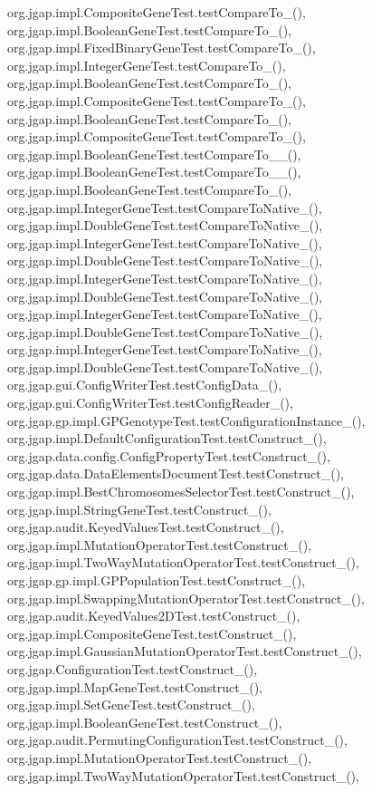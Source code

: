 org.\-jgap.\-impl.\-Composite\-Gene\-Test.\-test\-Compare\-To\-\_(), org.\-jgap.\-impl.\-Boolean\-Gene\-Test.\-test\-Compare\-To\-\_(), org.\-jgap.\-impl.\-Fixed\-Binary\-Gene\-Test.\-test\-Compare\-To\-\_(), org.\-jgap.\-impl.\-Integer\-Gene\-Test.\-test\-Compare\-To\-\_(), org.\-jgap.\-impl.\-Boolean\-Gene\-Test.\-test\-Compare\-To\-\_(), org.\-jgap.\-impl.\-Composite\-Gene\-Test.\-test\-Compare\-To\-\_(), org.\-jgap.\-impl.\-Boolean\-Gene\-Test.\-test\-Compare\-To\-\_(), org.\-jgap.\-impl.\-Composite\-Gene\-Test.\-test\-Compare\-To\-\_(), org.\-jgap.\-impl.\-Boolean\-Gene\-Test.\-test\-Compare\-To\-\_\-\_(), org.\-jgap.\-impl.\-Boolean\-Gene\-Test.\-test\-Compare\-To\-\_\-\_(), org.\-jgap.\-impl.\-Boolean\-Gene\-Test.\-test\-Compare\-To\-\_(), org.\-jgap.\-impl.\-Integer\-Gene\-Test.\-test\-Compare\-To\-Native\-\_(), org.\-jgap.\-impl.\-Double\-Gene\-Test.\-test\-Compare\-To\-Native\-\_(), org.\-jgap.\-impl.\-Integer\-Gene\-Test.\-test\-Compare\-To\-Native\-\_(), org.\-jgap.\-impl.\-Double\-Gene\-Test.\-test\-Compare\-To\-Native\-\_(), org.\-jgap.\-impl.\-Integer\-Gene\-Test.\-test\-Compare\-To\-Native\-\_(), org.\-jgap.\-impl.\-Double\-Gene\-Test.\-test\-Compare\-To\-Native\-\_(), org.\-jgap.\-impl.\-Integer\-Gene\-Test.\-test\-Compare\-To\-Native\-\_(), org.\-jgap.\-impl.\-Double\-Gene\-Test.\-test\-Compare\-To\-Native\-\_(), org.\-jgap.\-impl.\-Integer\-Gene\-Test.\-test\-Compare\-To\-Native\-\_(), org.\-jgap.\-impl.\-Double\-Gene\-Test.\-test\-Compare\-To\-Native\-\_(), org.\-jgap.\-gui.\-Config\-Writer\-Test.\-test\-Config\-Data\-\_(), org.\-jgap.\-gui.\-Config\-Writer\-Test.\-test\-Config\-Reader\-\_(), org.\-jgap.\-gp.\-impl.\-G\-P\-Genotype\-Test.\-test\-Configuration\-Instance\-\_(), org.\-jgap.\-impl.\-Default\-Configuration\-Test.\-test\-Construct\-\_(), org.\-jgap.\-data.\-config.\-Config\-Property\-Test.\-test\-Construct\-\_(), org.\-jgap.\-data.\-Data\-Elements\-Document\-Test.\-test\-Construct\-\_(), org.\-jgap.\-impl.\-Best\-Chromosomes\-Selector\-Test.\-test\-Construct\-\_(), org.\-jgap.\-impl.\-String\-Gene\-Test.\-test\-Construct\-\_(), org.\-jgap.\-audit.\-Keyed\-Values\-Test.\-test\-Construct\-\_(), org.\-jgap.\-impl.\-Mutation\-Operator\-Test.\-test\-Construct\-\_(), org.\-jgap.\-impl.\-Two\-Way\-Mutation\-Operator\-Test.\-test\-Construct\-\_(), org.\-jgap.\-gp.\-impl.\-G\-P\-Population\-Test.\-test\-Construct\-\_(), org.\-jgap.\-impl.\-Swapping\-Mutation\-Operator\-Test.\-test\-Construct\-\_(), org.\-jgap.\-audit.\-Keyed\-Values2\-D\-Test.\-test\-Construct\-\_(), org.\-jgap.\-impl.\-Composite\-Gene\-Test.\-test\-Construct\-\_(), org.\-jgap.\-impl.\-Gaussian\-Mutation\-Operator\-Test.\-test\-Construct\-\_(), org.\-jgap.\-Configuration\-Test.\-test\-Construct\-\_(), org.\-jgap.\-impl.\-Map\-Gene\-Test.\-test\-Construct\-\_(), org.\-jgap.\-impl.\-Set\-Gene\-Test.\-test\-Construct\-\_(), org.\-jgap.\-impl.\-Boolean\-Gene\-Test.\-test\-Construct\-\_(), org.\-jgap.\-audit.\-Permuting\-Configuration\-Test.\-test\-Construct\-\_(), org.\-jgap.\-impl.\-Mutation\-Operator\-Test.\-test\-Construct\-\_(), org.\-jgap.\-impl.\-Two\-Way\-Mutation\-Operator\-Test.\-test\-Construct\-\_(), 